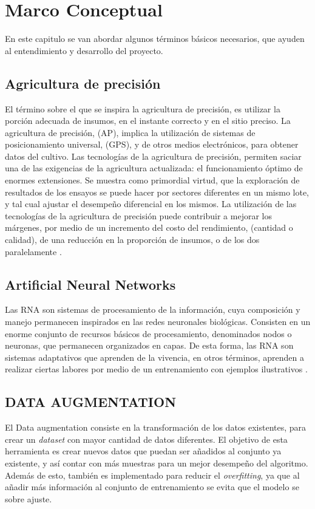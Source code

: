 \chapter{Marco Conceptual}
En este capitulo se van abordar algunos términos básicos necesarios, que ayuden al entendimiento y desarrollo del proyecto. 

\section{Agricultura de precisión} El término sobre el que se inspira la agricultura de precisión, es utilizar la porción adecuada de insumos, en el instante correcto y en el sitio preciso. La agricultura de precisión, (AP), implica la utilización de sistemas de posicionamiento universal, (GPS), y de otros medios electrónicos, para obtener datos del cultivo. Las tecnologías de la agricultura de precisión, permiten saciar una de las exigencias de la agricultura actualizada: el funcionamiento óptimo de enormes extensiones. Se muestra como primordial virtud, que la exploración de resultados de los ensayos se puede hacer por sectores diferentes en un mismo lote, y tal cual ajustar el desempeño diferencial en los mismos. La utilización de las tecnologías de la agricultura de precisión puede contribuir a mejorar los márgenes, por medio de un incremento del costo del rendimiento, (cantidad o calidad), de una reducción en la proporción de insumos, o de los dos paralelamente \cite{ref_10}.

\section{Artificial Neural Networks} Las RNA son sistemas de procesamiento de la información, cuya composición y manejo permanecen inspirados en las redes neuronales biológicas. Consisten en un enorme conjunto de recursos básicos de procesamiento, denominados nodos o neuronas, que permanecen organizados en capas. De esta forma, las RNA son sistemas adaptativos que aprenden de la vivencia, en otros términos, aprenden a realizar ciertas labores por medio de un entrenamiento con ejemplos ilustrativos \cite{ref_11}.
\\ 
\section{DATA AUGMENTATION}
El Data augmentation consiste en la transformación de los datos existentes, para crear un \textit{dataset} con mayor cantidad de datos diferentes. El objetivo de esta herramienta es crear nuevos datos que puedan ser añadidos al conjunto ya existente, y así contar con más muestras para un mejor desempeño del algoritmo. Además de esto, también es implementado para reducir el \textit{overfitting}, ya que al añadir más información al conjunto de entrenamiento se evita que el modelo se sobre ajuste. \\


